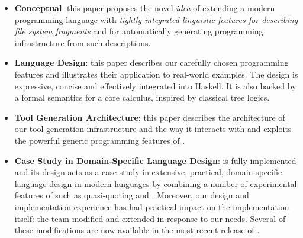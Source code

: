 \begin{itemize}
\item {\bf Conceptual}:  this paper proposes the novel {\em idea} 
of extending a modern programming language with
{\em tightly integrated linguistic features for describing file system 
fragments}
and for automatically generating programming infrastructure from such 
descriptions.

\item {\bf Language Design}: this paper describes our 
  carefully chosen \forest{}
  programming features and illustrates their application to
  real-world examples.
  The design is expressive, concise and effectively integrated into
  Haskell.  It is also backed by a formal semantics for a core calculus,
  inspired by classical tree logics.

\item {\bf Tool Generation Architecture}: this paper describes the architecture of
  our tool generation infrastructure and the way it interacts with and 
  exploits the powerful generic programming features of \haskell{}.

\item {\bf Case Study in Domain-Specific Language Design}: \forest{}
  is fully implemented and its design 
  acts as a case study in extensive, practical, domain-specific
  language design in modern languages by combining a number of
  experimental features of \haskell{} such as quasi-quoting and \template{}.
  Moreover, our \forest{} design and implementation experience 
  has had practical impact on the \haskell{} implementation itself:  
  the \haskell{} team modified and extended
  \template{} in response to our needs.  Several of these modifications
  are now available in the most recent release of \haskell{}.
\end{itemize}



